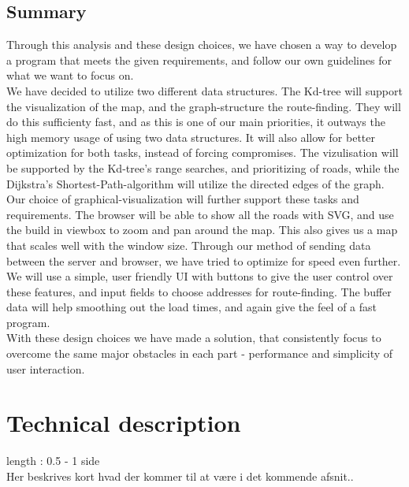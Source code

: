 \documentclass[a4paper,10pt,titlepage]{article}
\begin{document}
		\subsection{Summary}
Through this analysis and these design choices, we have chosen a way to develop a program that meets the given requirements, and follow our own guidelines for what we want to focus on.\\
We have decided to utilize two different data structures. The Kd-tree will support the visualization of the map, and the graph-structure the route-finding. They will do this sufficienty fast, and as this is one of our main priorities, it outways the high memory usage of using two data structures. It will also allow for better optimization for both tasks, instead of forcing compromises. The vizulisation will be supported by the Kd-tree's range searches, and prioritizing of roads, while the Dijkstra's Shortest-Path-algorithm will utilize the directed edges of the graph.\\
Our choice of graphical-visualization will further support these tasks and requirements. The browser will be able to show all the roads with SVG, and use the build in viewbox to zoom and pan around the map. This also gives us a map that scales well with the window size. Through our method of sending data between the server and browser, we have tried to optimize for speed even further.\\
We will use a simple, user friendly UI with buttons to give the user control over these features, and input fields to choose addresses for route-finding. The buffer data will help smoothing out the load times, and again give the feel of a fast program.\\
With these design choices we have made a solution, that consistently focus to overcome the same major obstacles in each part - performance and simplicity of user interaction.
			
	\newpage		
	\section{Technical description}
		length : 0.5 - 1 side\\
		Her beskrives kort hvad der kommer til at være i det kommende afsnit..
		
\end{document}
